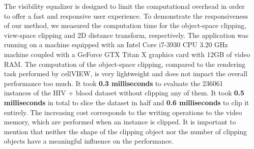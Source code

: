  

The visibility equalizer is designed to limit the computational overhead in order to offer a fast and responsive user experience.
To demonstrate the responsiveness of our method, we measured the computation time for the object-space clipping, view-space clipping and 2D distance transform, respectively.
The application was running on a machine equipped with an Intel Core i7-3930 CPU 3.20 GHz machine coupled with a GeForce GTX Titan X graphics card with 12GB of video RAM. 
The computation of the object-space clipping, compared to the rendering task performed by cellVIEW, is very lightweight and does not impact the overall performance too much. 
It took \textbf{0.3 milliseconds} to evaluate the 236061 instances of the HIV + blood dataset without clipping any of them.
It took \textbf{0.5 milliseconds} in total to slice the dataset in half and \textbf{0.6 milliseconds} to clip it entirely.
The increasing cost corresponds to the writing operations to the video memory, which are performed when an instance is clipped.
It is important to mention that neither the shape of the clipping object nor the number of clipping objects have a meaningful influence on the performance.

